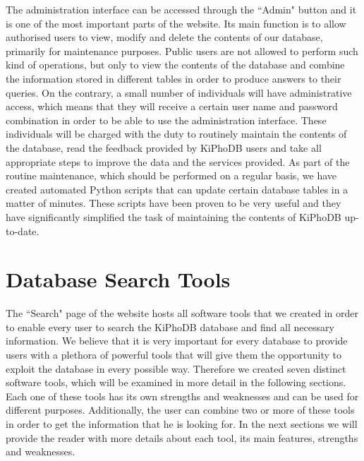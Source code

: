 The administration interface can be accessed through the ``Admin" button and it is one of the most important parts of the website.
Its main function is to allow authorised users to view, modify and delete the contents of our database, primarily for maintenance purposes.
Public users are not allowed to perform such kind of operations, but only to view the contents of the database and combine the information stored in different tables in order to produce answers to their queries.
On the contrary, a small number of individuals will have administrative access, which means that they will receive a certain user name and password combination in order to be able to use the administration interface.
These individuals will be charged with the duty to routinely maintain the contents of the database, read the feedback provided by KiPhoDB users and take all appropriate steps to improve the data and the services provided.
As part of the routine maintenance, which should be performed on a regular basis, we have created automated Python scripts that can update certain database tables in a matter of minutes.
These scripts have been proven to be very useful and they have significantly simplified the task of maintaining the contents of KiPhoDB up-to-date.

\section{Database Search Tools}
The ``Search" page of the website hosts all software tools that we created in order to enable every user to search the KiPhoDB database and find all necessary information.
We believe that it is very important for every database to provide users with a plethora of powerful tools that will give them the opportunity to exploit the database in every possible way.
Therefore we created seven distinct software tools, which will be examined in more detail in the following sections.
Each one of these tools has its own strengths and weaknesses and can be used for different purposes.
Additionally, the user can combine two or more of these tools in order to get the information that he is looking for.
In the next sections we will provide the reader with more details about each tool, its main features, strengths and weaknesses.

